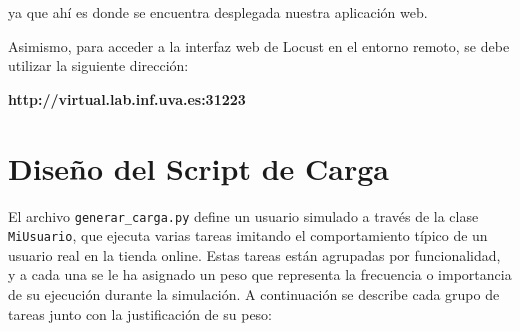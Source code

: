 \documentclass[10pt]{book}
\begin{document}
ya que ahí es donde se encuentra desplegada nuestra aplicación web.

Asimismo, para acceder a la interfaz web de Locust en el entorno remoto, se debe utilizar la siguiente dirección:

\begin{center}
\textbf{http://virtual.lab.inf.uva.es:31223}
\end{center}


\section{Diseño del Script de Carga}  \label{sec:pesos}

El archivo \texttt{generar\_carga.py} define un usuario simulado a través de la clase \texttt{MiUsuario}, que ejecuta varias tareas imitando el comportamiento típico de un usuario real en la tienda online. Estas tareas están agrupadas por funcionalidad, y a cada una se le ha asignado un peso que representa la frecuencia o importancia de su ejecución durante la simulación. A continuación se describe cada grupo de tareas junto con la justificación de su peso:
\end{document}
